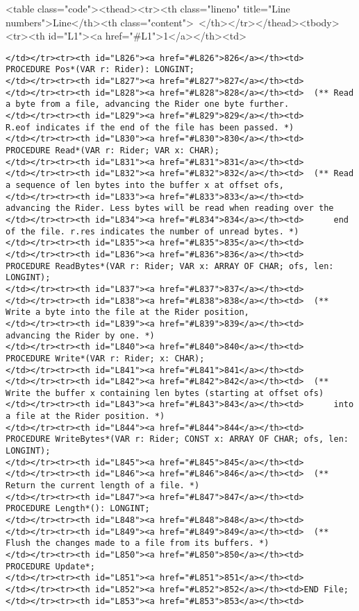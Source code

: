 <table class="code"><thead><tr><th class="lineno" title="Line numbers">Line</th><th class="content"> </th></tr></thead><tbody><tr><th id="L1"><a href="#L1">1</a></th><td>\documentclass[a4paper,11pt]{article}
\begin{document}
\begin{lstlisting}[language=Oberon,frame=none,caption={Low-level Files API}]
</td></tr><tr><th id="L826"><a href="#L826">826</a></th><td>  PROCEDURE Pos*(VAR r: Rider): LONGINT;
</td></tr><tr><th id="L827"><a href="#L827">827</a></th><td>
</td></tr><tr><th id="L828"><a href="#L828">828</a></th><td>  (** Read a byte from a file, advancing the Rider one byte further.
</td></tr><tr><th id="L829"><a href="#L829">829</a></th><td>      R.eof indicates if the end of the file has been passed. *)
</td></tr><tr><th id="L830"><a href="#L830">830</a></th><td>  PROCEDURE Read*(VAR r: Rider; VAR x: CHAR);
</td></tr><tr><th id="L831"><a href="#L831">831</a></th><td>
</td></tr><tr><th id="L832"><a href="#L832">832</a></th><td>  (** Read a sequence of len bytes into the buffer x at offset ofs,
</td></tr><tr><th id="L833"><a href="#L833">833</a></th><td>      advancing the Rider. Less bytes will be read when reading over the
</td></tr><tr><th id="L834"><a href="#L834">834</a></th><td>      end of the file. r.res indicates the number of unread bytes. *)
</td></tr><tr><th id="L835"><a href="#L835">835</a></th><td>
</td></tr><tr><th id="L836"><a href="#L836">836</a></th><td>  PROCEDURE ReadBytes*(VAR r: Rider; VAR x: ARRAY OF CHAR; ofs, len: LONGINT);
</td></tr><tr><th id="L837"><a href="#L837">837</a></th><td>
</td></tr><tr><th id="L838"><a href="#L838">838</a></th><td>  (** Write a byte into the file at the Rider position,
</td></tr><tr><th id="L839"><a href="#L839">839</a></th><td>      advancing the Rider by one. *)
</td></tr><tr><th id="L840"><a href="#L840">840</a></th><td>  PROCEDURE Write*(VAR r: Rider; x: CHAR);
</td></tr><tr><th id="L841"><a href="#L841">841</a></th><td>
</td></tr><tr><th id="L842"><a href="#L842">842</a></th><td>  (** Write the buffer x containing len bytes (starting at offset ofs)
</td></tr><tr><th id="L843"><a href="#L843">843</a></th><td>      into a file at the Rider position. *)
</td></tr><tr><th id="L844"><a href="#L844">844</a></th><td>  PROCEDURE WriteBytes*(VAR r: Rider; CONST x: ARRAY OF CHAR; ofs, len: LONGINT);
</td></tr><tr><th id="L845"><a href="#L845">845</a></th><td>
</td></tr><tr><th id="L846"><a href="#L846">846</a></th><td>  (** Return the current length of a file. *)
</td></tr><tr><th id="L847"><a href="#L847">847</a></th><td>  PROCEDURE Length*(): LONGINT;
</td></tr><tr><th id="L848"><a href="#L848">848</a></th><td>
</td></tr><tr><th id="L849"><a href="#L849">849</a></th><td>  (** Flush the changes made to a file from its buffers. *)
</td></tr><tr><th id="L850"><a href="#L850">850</a></th><td>  PROCEDURE Update*;
</td></tr><tr><th id="L851"><a href="#L851">851</a></th><td>
</td></tr><tr><th id="L852"><a href="#L852">852</a></th><td>END File;
</td></tr><tr><th id="L853"><a href="#L853">853</a></th><td>\end{lstlisting}
\end{document}
